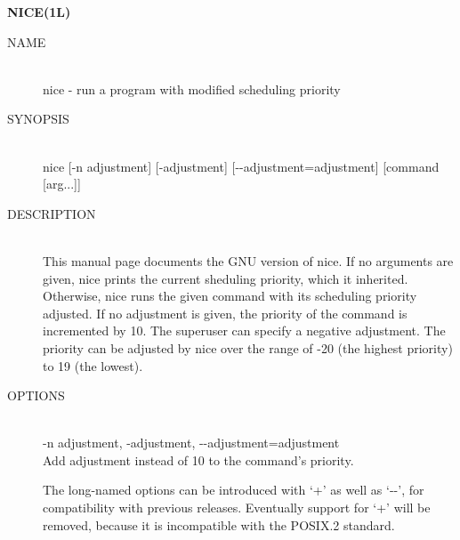 
\begin{center} {\bf
NICE(1L)
} \end{center}
\begin{description}


\item[NAME] \hfill \\
       nice - run a program with modified scheduling priority

\item[SYNOPSIS] \hfill \\
       nice     [-n    adjustment]    [-adjustment]    [-\hspace{.01cm}-adjustment=adjustment] [command [arg...]]

\item[DESCRIPTION] \hfill \\
       This manual page documents the GNU version of nice.  If no
       arguments  are  given,  nice  prints the current sheduling
       priority, which it inherited.  Otherwise,  nice  runs  the
       given  command  with its scheduling priority adjusted.  If
       no adjustment is given, the priority  of  the  command  is
       incremented  by  10.  The superuser can specify a negative
       adjustment.  The priority can be adjusted by nice over the
       range of -20 (the highest priority) to 19 (the lowest).

\item[OPTIONS] \hfill \\
       -n adjustment, -adjustment, -\hspace{.01cm}-adjustment=adjustment \\
              Add  adjustment instead of 10 to the command's priority.

       The long-named options can be introduced with `+' as  well
       as  `-\hspace{.01cm}-', for compatibility with previous releases.  Eventually 
       support for `+' will  be  removed,  because  it  is
       incompatible with the POSIX.2 standard.
\end{description}

